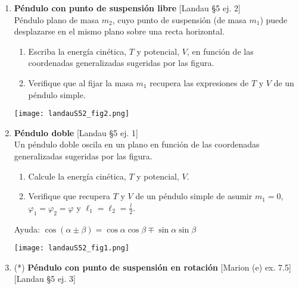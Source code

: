 \documentclass[11pt, spanish, a4paper, twoside]{article}
\begin{document}
\begin{enumerate}
\item \begin{minipage}[t][4cm]{0.7\textwidth}
\textbf{Péndulo con punto de suspensión libre} [Landau \S5 ej. 2]\\
Péndulo plano de masa \(m_2\), cuyo punto de suspensión (de masa \(m_1\)) puede desplazarse en el mismo plano sobre una recta horizontal.
\begin{enumerate}
	\item Escriba la energía cinética, \(T\) y potencial, \(V\), en función de las coordenadas generalizadas sugeridas por las figura.
	\item Verifique que al fijar la masa \(m_1\) recupera las expresiones de \(T\) y \(V\) de un péndulo simple.
\end{enumerate}
\end{minipage}
\begin{minipage}[c][1cm][t]{0.3\textwidth}
        \texttt{[image: landauS52\_fig2.png]}
\end{minipage}



\item \begin{minipage}[t][4cm]{0.7\textwidth}
\textbf{Péndulo doble} [Landau \S5 ej. 1]\\
Un péndulo doble oscila en un plano en función de las coordenadas generalizadas sugeridas por las figura.
\begin{enumerate}
	\item Calcule la energía cinética, \(T\) y potencial, \(V\).
	\item Verifique que recupera \(T\) y \(V\) de un péndulo simple de asumir \(m_1=0\), \(\varphi_1 = \varphi_2 = \varphi\) y \(\ell_1 = \ell_2 = \frac{l}{2}\).
\end{enumerate}
Ayuda: \( \cos(\alpha \pm \beta) = \cos{ \alpha} \cos{ \beta \mp \sin \alpha} \sin{ \beta } \)
\end{minipage}
\begin{minipage}[c][0.5cm][t]{0.3\textwidth}
	\texttt{[image: landauS52\_fig1.png]}
\end{minipage}



\item
	\begin{minipage}[t][7.1cm]{0.5\textwidth}
		(*) \textbf{Péndulo con punto de suspensión en rotación} [Marion (e) ex. 7.5] [Landau \S5 ej. 3]\\


\end{minipage}
\end{enumerate}
\end{document}

